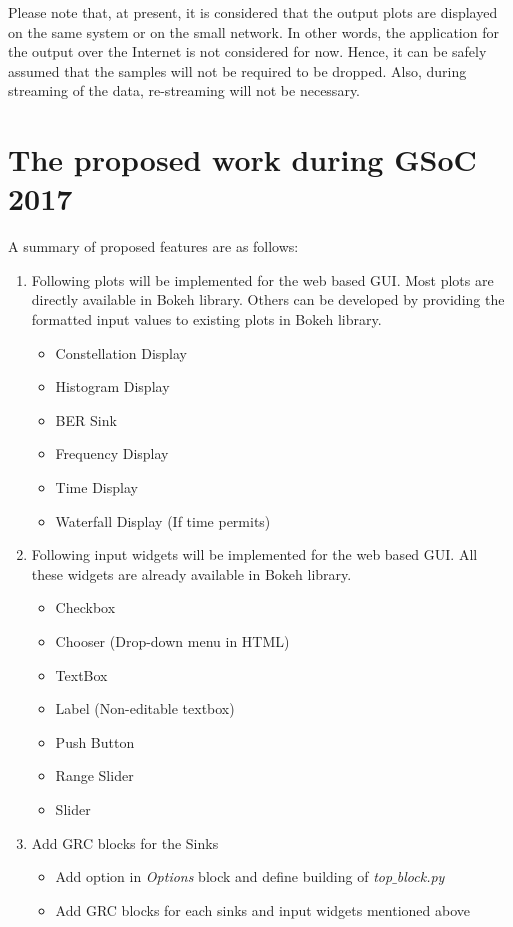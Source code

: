 \documentclass[a4paper, 11pt]{article}
\begin{document}
Please note that, at present, it is considered that the output plots are displayed on the same system or on the small network. In other words, the application for the output over the Internet is not considered for now. Hence, it can be safely assumed that the samples will not be required to be dropped. Also, during streaming of the data, re-streaming will not be necessary.

\section{The proposed work during GSoC 2017}
A summary of proposed features are as follows:

\begin{enumerate}
\item Following plots will be implemented for the web based GUI. Most plots are directly available in Bokeh library. Others can be developed by providing the formatted input values to existing plots in Bokeh library.

\begin{itemize}
\item Constellation Display
\item Histogram Display
\item BER Sink
\item Frequency Display
\item Time Display
\item Waterfall Display (If time permits)
\end{itemize}

\item Following input widgets will be implemented for the web based GUI. All these widgets are already available in Bokeh library.
\begin{itemize}
\item Checkbox
\item Chooser (Drop-down menu in HTML)
\item TextBox
\item Label (Non-editable textbox)
\item Push Button
\item Range Slider
\item Slider
\end{itemize}

\item Add GRC blocks for the Sinks
\begin{itemize}
\item Add option in \textit{Options} block and define building of \textit{top$\_$block.py}
\item Add GRC blocks for each sinks and input widgets mentioned above
\end{itemize}

\end{enumerate}
\end{document}
